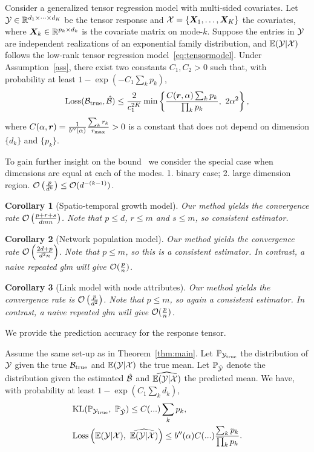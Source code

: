 \documentclass[11pt]{article}
\theoremstyle{plain}
\newtheorem{cor}{Corollary}
\theoremstyle{definition}
\begin{document}
  
\begin{thm}[Convergence]\label{thm:main}
Consider a generalized tensor regression model with multi-sided covariates. Let $\mathcal{Y}\in\mathbb{R}^{d_1\times \cdots\times d_K}$ be the tensor response and $\mathcal{X}=\{\bm X_1,\ldots,\bm X_K\}$ the covariates, where $\bm X_k\in\mathbb{R}^{p_k\times d_k}$ is the covariate matrix on mode-$k$. Suppose the entries in $\mathcal{Y}$ are independent realizations of an exponential family distribution, and $\mathbb{E}(\mathcal{Y}|\mathcal{X})$ follows the low-rank tensor regression model~\eqref{eq:tensormodel}. Under Assumption~\ref{ass}, there exist two constants $C_1, C_2>0$ such that, with probability at least $1-\exp(-C_1\sum_k p_k)$, 
\[
\text{Loss}(\trueB, \hat \tB) \leq  {2\over c_1^{2K}} \min\left\{ {C(\mr,\alpha)\sum_k p_k \over \prod_k p_k},\ 2\alpha^2 \right\},
\]
where $C(\alpha,\bm{r})={1 \over b''(\alpha)}{\sum_k r_k \over r_{\max}}>0$ is a constant that does not depend on dimension $\{d_k\}$ and $\{p_k\}$. 
\end{thm}

To gain further insight on the bound~\label{thm:main} we consider the special case when dimensions are equal at each of the modes. 1. binary case; 2. large dimension region. $\mathcal{O}\left({p \over d^k}\right)\leq \mathcal{O}(d^{-(k-1)})$.

\begin{cor}[Spatio-temporal growth model] Our method yields the convergence rate $\mathcal{O}\left({p+r+s\over dmn}\right)$. Note that $p\leq d$, $r\leq m$ and $s\leq m$, so consistent estimator. 
\end{cor}

\begin{cor} [Network population model] Our method yields the convergence rate $\mathcal{O}\left({2d+p\over d^2n}\right)$. Note that $p\leq m$, so this is a consistent estimator. In contrast, a naive repeated glm will give $\mathcal{O}({p\over n})$.
\end{cor}

\begin{cor} [Link model with node attributes] Our method yields the convergence rate is $\mathcal{O}\left({p\over d^2}\right)$. Note that $p\leq m$, so again a consistent estimator. In contrast, a naive repeated glm will give $\mathcal{O}({p\over n})$.
\end{cor}

We provide the prediction accuracy for the response tensor.  
\begin{thm} 
Assume the same set-up as in Theorem~\eqref{thm:main}. Let $\mathbb{P}_{\mathcal{Y}_{\text{true}}}$ the distribution of $\mathcal{Y}$ given the true $\mathcal{B}_{\text{true}}$ and $\mathbb{E}(\mathcal{Y}|\mathcal{X})$ the true mean. Let $\mathbb{P}_{\hat {\mathcal{Y}}}$ denote the distribution given the estimated $\hat {\mathcal{B}}$ and $\widehat{\mathbb{E}(\mathcal{Y}|\mathcal{X})}$ the predicted mean. We have, with probability at least $1-\exp(C_1\sum_k d_k)$,
\begin{align}
&\text{KL}(\mathbb{P}_{\tY_{\text{true}}},\ \mathbb{P}_{\hat \tY})\leq  C(...) \sum_k p_k,\\
&\text{Loss}\left(\mathbb{E}(\tY|\tX),\ \widehat{\mathbb{E}(\tY|\tX)}\right)\leq b''(\alpha)C(...) {\sum_k p_k\over \prod_k p_k}.
\end{align}
\end{thm}
\end{document}

